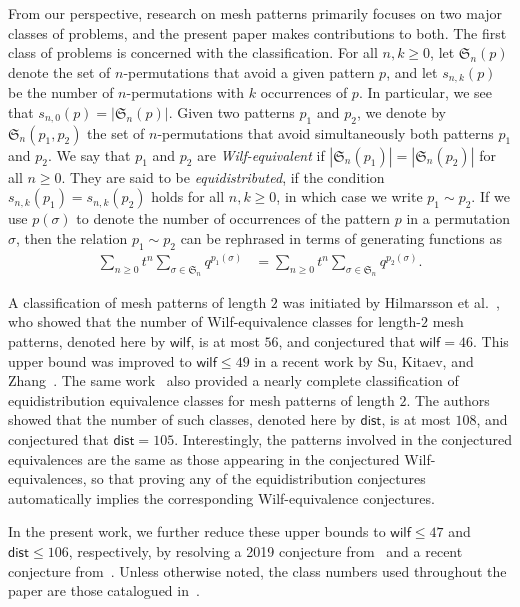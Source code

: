 \documentclass[12pt]{article}
\def\fS{\mathfrak{S}}
\def\wilf{\mathsf{wilf}}
\def\dist{\mathsf{dist}}
\begin{document}
From our perspective, research on mesh patterns primarily focuses on two major classes of problems, and the present paper makes contributions to both. The first class of problems is concerned with the classification. For all $n,k\ge 0$, let $\fS_n(p)$ denote the set of $n$-permutations that avoid a given pattern $p$, and let $s_{n,k}(p)$ be the number of $n$-permutations with $k$ occurrences of $p$. In particular, we see that $s_{n,0}(p)=|\fS_n(p)|$. Given two patterns $p_1$ and $p_2$, we denote by $\fS_n(p_1,p_2)$ the set of $n$-permutations that avoid simultaneously both patterns $p_1$ and $p_2$. We say that $p_1$ and $p_2$ are \emph{Wilf-equivalent} if $|\fS_n(p_1)|=|\fS_n(p_2)|$ for all $n\ge 0$. They are said to be \emph{equidistributed}, if the condition $s_{n,k}(p_1)=s_{n,k}(p_2)$ holds for all $n,k\ge 0$, in which case we write $p_1\sim p_2$. If we use $p(\sigma)$ to denote the number of occurrences of the pattern $p$ in a permutation $\sigma$, then the relation $p_1\sim p_2$ can be rephrased in terms of generating functions as 
\begin{align*}
  \sum_{n\ge 0}t^n\sum_{\sigma\in\fS_n}q^{p_1(\sigma)} &= \sum_{n\ge 0}t^n\sum_{\sigma\in\fS_n}q^{p_2(\sigma)}.
\end{align*}

A classification of mesh patterns of length $2$ was initiated by Hilmarsson et al.~\cite{Hilmarsson2015Wilf}, who showed that the number of Wilf-equivalence classes for length-$2$ mesh patterns, denoted here by $\wilf$, is at most $56$, and conjectured that $\wilf=46$. This upper bound was improved to $\wilf \le 49$ in a recent work by Su, Kitaev, and Zhang~\cite{SKZ2026}. The same work~\cite{SKZ2026} also provided a nearly complete classification of equidistribution equivalence classes for mesh patterns of length $2$. The authors showed that the number of such classes, denoted here by $\dist$, is at most $108$, and conjectured that $\dist=105$. Interestingly, the patterns involved in the conjectured equivalences are the same as those appearing in the conjectured Wilf-equivalences, so that proving any of the equidistribution conjectures automatically implies the corresponding Wilf-equivalence conjectures.  

In the present work, we further reduce these upper bounds to $\wilf \le 47$ and $\dist \le 106$, respectively, by resolving a 2019 conjecture from~\cite{KZ2019} and a recent conjecture from~\cite{SKZ2026}. Unless otherwise noted, the class numbers used throughout the paper are those catalogued in~\cite{SKZ2026}.
\end{document}

